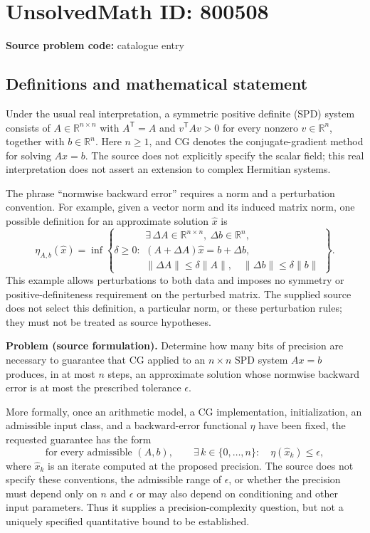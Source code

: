 \documentclass[11pt]{article}
\newcommand{\R}{\mathbb{R}}
\begin{document}
\section*{UnsolvedMath ID: 800508}
\textbf{Source problem code:} catalogue entry
\subsection{Definitions and mathematical statement}
Under the usual real interpretation, a symmetric positive definite (SPD) system consists of \(A\in\R^{n\times n}\) with \(A^{\mathsf T}=A\) and \(v^{\mathsf T}Av>0\) for every nonzero \(v\in\R^n\), together with \(b\in\R^n\). Here \(n\geq1\), and CG denotes the conjugate-gradient method for solving \(Ax=b\). The source does not explicitly specify the scalar field; this real interpretation does not assert an extension to complex Hermitian systems.

The phrase ``normwise backward error'' requires a norm and a perturbation convention. For example, given a vector norm and its induced matrix norm, one possible definition for an approximate solution \(\widehat x\) is
\[
\eta_{A,b}(\widehat x)=\inf\left\{\delta\geq0:\begin{array}{l}
\exists\,\Delta A\in\R^{n\times n},\ \Delta b\in\R^n,\\
(A+\Delta A)\widehat x=b+\Delta b,\\
\|\Delta A\|\leq\delta\|A\|,\quad
\|\Delta b\|\leq\delta\|b\|
\end{array}\right\}.
\]
This example allows perturbations to both data and imposes no symmetry or positive-definiteness requirement on the perturbed matrix. The supplied source does not select this definition, a particular norm, or these perturbation rules; they must not be treated as source hypotheses.

\textbf{Problem (source formulation).} Determine how many bits of precision are necessary to guarantee that CG applied to an \(n\times n\) SPD system \(Ax=b\) produces, in at most \(n\) steps, an approximate solution whose normwise backward error is at most the prescribed tolerance \(\epsilon\).

More formally, once an arithmetic model, a CG implementation, initialization, an admissible input class, and a backward-error functional \(\eta\) have been fixed, the requested guarantee has the form
\[
\text{for every admissible }(A,b),\qquad
\exists\,k\in\{0,\ldots,n\}:\quad
\eta(\widehat x_k)\leq\epsilon,
\]
where \(\widehat x_k\) is an iterate computed at the proposed precision. The source does not specify these conventions, the admissible range of \(\epsilon\), or whether the precision must depend only on \(n\) and \(\epsilon\) or may also depend on conditioning and other input parameters. Thus it supplies a precision-complexity question, but not a uniquely specified quantitative bound to be established.
\end{document}
